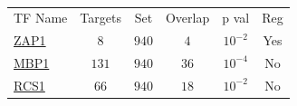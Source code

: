 \begin{table}[h!]
\centering 
{}
\begin{tabular}{l c c c c c}
\hline

TF Name &	Targets &	Set &	Overlap &	p val &	Reg \\ 
\href{www.yeastgenome.org/cgi-bin/locus.fpl?locus=ZAP1}{ZAP1} &	 $8$ &	$940$&	$4$ &	$10^{-2}$ & 	 Yes \\ 
\href{www.yeastgenome.org/cgi-bin/locus.fpl?locus=MBP1}{MBP1} &	 $131$ &	$940$&	$36$ &	$10^{-4}$ & 	 No \\ 
\href{www.yeastgenome.org/cgi-bin/locus.fpl?locus=RCS1}{RCS1} &	 $66$ &	$940$&	$18$ &	$10^{-2}$ & 	 No \\ 
\hline
\end{tabular} 
\caption[]{}
\label{}
\end{table} 


